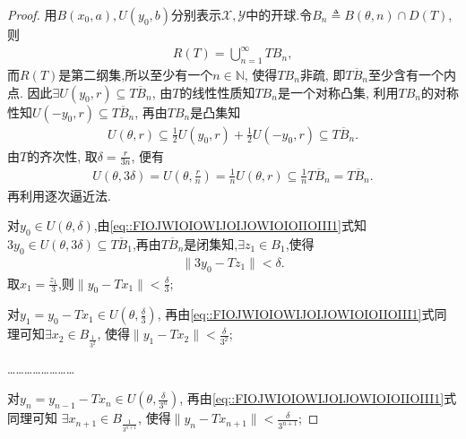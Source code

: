 \documentclass[../../main.tex]{subfiles}%
\begin{document}
\begin{proof}

用$B(x_0,a),U(y_0,b)$分别表示$\mathscr{X},\mathscr{Y}$中的开球.令$B_n\triangleq B(\theta,n)\cap D(T)$,则
\begin{align*}
R(T)=\bigcup\limits_{n=1}^{\infty}TB_n,
\end{align*}
而$R(T)$是第二纲集,所以至少有一个$n\in\mathbb{N}$, 使得$TB_n$非疏, 即$\overline{TB_n}$至少含有一个内点. 因此$\exists U(y_0,r)\subseteq\overline{TB_n}$, 由$T$的线性性质知$TB_n$是一个对称凸集, 利用$TB_n$的对称性知$U(-y_0,r)\subseteq\overline{TB_n}$, 再由$TB_n$是凸集知
\begin{align*}
U(\theta,r)\subseteq\frac{1}{2}U(y_0,r)+\frac{1}{2}U(-y_0,r)\subseteq\overline{TB_n}.
\end{align*}
由$T$的齐次性, 取$\delta=\frac{r}{3n}$, 便有
\begin{align}\label{eq::FIOJWIOIOWIJOIJOWIOIOIIOIII1}
U\left( \theta ,3\delta \right) =U\left( \theta ,\frac{r}{n} \right) =\frac{1}{n}U\left( \theta ,r \right) \subseteq \frac{1}{n}\overline{TB_n }=\overline{TB_n }.
\end{align}
再利用逐次逼近法.

对$y_0\in U(\theta,\delta)$,由\eqref{eq::FIOJWIOIOWIJOIJOWIOIOIIOIII1}式知$3y_0\in U(\theta,3\delta)\subseteq \overline{TB_1}$,再由$\overline{TB_n}$是闭集知,$\exists z_1\in B_1$,使得
\begin{align*}
\|3y_0-Tz_1\|<\delta.
\end{align*}
取$x_1=\frac{z_1}{3}$,则$\|y_0-Tx_1\|<\frac{\delta}{3}$;

对$y_1=y_0-Tx_1\in U\left(\theta,\frac{\delta}{3}\right)$, 再由\eqref{eq::FIOJWIOIOWIJOIJOWIOIOIIOIII1}式同理可知$\exists x_2\in B_{\frac{1}{3^2}}$, 使得$\|y_1-Tx_2\|<\frac{\delta}{3^2}$;

……………………

对$y_n=y_{n-1}-Tx_n\in U\left(\theta,\frac{\delta}{3^n}\right)$, 再由\eqref{eq::FIOJWIOIOWIJOIJOWIOIOIIOIII1}式同理可知 $\exists x_{n+1}\in B_{\frac{1}{3^{n+1}}}$, 使得$\|y_n-Tx_{n+1}\|<\frac{\delta}{3^{n+1}}$;


\end{proof}
\end{document}
